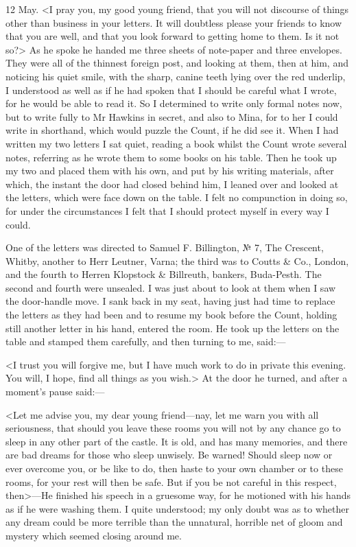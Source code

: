 \begin{diary}{12 May.}
<I pray you, my good young friend, that you will not discourse of things other than business in your letters. It will doubtless please your friends to know that you are well, and that you look forward to getting home to them. Is it not so?> As he spoke he handed me three sheets of note-paper and three envelopes. They were all of the thinnest foreign post, and looking at them, then at him, and noticing his quiet smile, with the sharp, canine teeth lying over the red underlip, I understood as well as if he had spoken that I should be careful what I wrote, for he would be able to read it. So I determined to write only formal notes now, but to write fully to Mr Hawkins in secret, and also to Mina, for to her I could write in shorthand, which would puzzle the Count, if he did see it. When I had written my two letters I sat quiet, reading a book whilst the Count wrote several notes, referring as he wrote them to some books on his table. Then he took up my two and placed them with his own, and put by his writing materials, after which, the instant the door had closed behind him, I leaned over and looked at the letters, which were face down on the table. I felt no compunction in doing so, for under the circumstances I felt that I should protect myself in every way I could.

One of the letters was directed to Samuel F\@. Billington, № 7, The Crescent, Whitby, another to Herr Leutner, Varna; the third was to Coutts \& Co., London, and the fourth to Herren Klopstock \& Billreuth, bankers, Buda-Pesth. The second and fourth were unsealed. I was just about to look at them when I saw the door-handle move. I sank back in my seat, having just had time to replace the letters as they had been and to resume my book before the Count, holding still another letter in his hand, entered the room. He took up the letters on the table and stamped them carefully, and then turning to me, said:—

<I trust you will forgive me, but I have much work to do in private this evening. You will, I hope, find all things as you wish.> At the door he turned, and after a moment's pause said:—

<Let me advise you, my dear young friend—nay, let me warn you with all seriousness, that should you leave these rooms you will not by any chance go to sleep in any other part of the castle. It is old, and has many memories, and there are bad dreams for those who sleep unwisely. Be warned! Should sleep now or ever overcome you, or be like to do, then haste to your own chamber or to these rooms, for your rest will then be safe. But if you be not careful in this respect, then>—He finished his speech in a gruesome way, for he motioned with his hands as if he were washing them. I quite understood; my only doubt was as to whether any dream could be more terrible than the unnatural, horrible net of gloom and mystery which seemed closing around me.
\end{diary}
 
